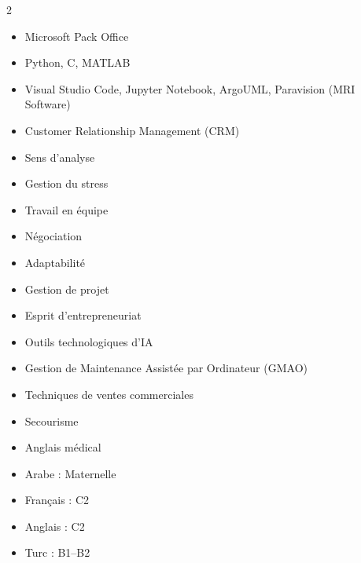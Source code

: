 \documentclass[8pt,a4paper]{altacv}
\begin{document}
\makecvheader
\begin{paracol}{2}

\small
\vspace{2pt}
\vspace{2pt}
\vspace{2pt}
\vspace{2pt}
\normalsize
\medskip

\textbf{\color{accent}{Hard skills}}
\begin{itemize}
  \item Microsoft Pack Office
  \item Python, C, MATLAB
  \item Visual Studio Code, Jupyter Notebook, ArgoUML, Paravision (MRI Software)
  \item Customer Relationship Management (CRM)
\end{itemize}
\medskip
\textbf{\color{accent}{Soft skills}}
\begin{itemize}
  \item Sens d’analyse
  \item Gestion du stress
  \item Travail en équipe
  \item Négociation
  \item Adaptabilité
  \item Gestion de projet
  \item Esprit d'entrepreneuriat
\end{itemize}
\medskip

\begin{itemize}
  \item Outils technologiques d’IA
  \item Gestion de Maintenance Assistée par Ordinateur (GMAO)
  \item Techniques de ventes commerciales
  \item Secourisme
  \item Anglais médical
\end{itemize}
\medskip

\begin{itemize}
  \item Arabe : Maternelle
  \item Français : C2
  \item Anglais : C2
  \item Turc : B1--B2
\end{itemize}
\medskip


\end{paracol}
\end{document}
